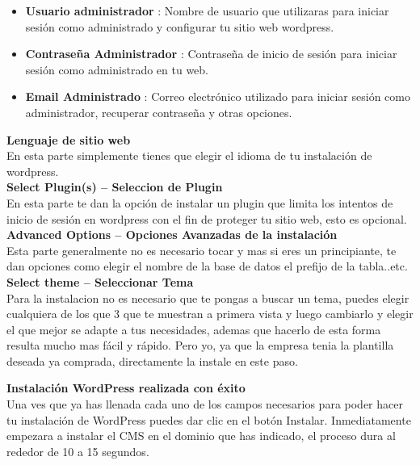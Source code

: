 		\begin{itemize}
			\item \textbf{Usuario administrador} : Nombre de usuario que utilizaras para iniciar sesión como administrado y configurar tu sitio web wordpress.
			\item \textbf{Contraseña Administrador} : Contraseña de inicio de sesión para iniciar sesión como administrado en tu web.
			\item \textbf{Email Administrado} : Correo electrónico utilizado para iniciar sesión como administrador, recuperar contraseña y otras opciones.
		\end{itemize}
		
		
		\textbf{Lenguaje de sitio web}\\
		
		En esta parte simplemente tienes que elegir el idioma de tu instalación de wordpress.\\
		
		\textbf{Select Plugin(s) – Seleccion de Plugin}\\
		
		En esta parte te dan la opción de instalar un plugin que limita los intentos de inicio de sesión en wordpress con el fin de proteger tu sitio web, esto es opcional.\\
		
		\textbf{Advanced Options  – Opciones Avanzadas de la instalación}\\
		
		Esta parte generalmente no es necesario tocar y mas si eres un principiante, te dan opciones como elegir el nombre de la base de datos el prefijo de la tabla..etc.\\
		
		\textbf{Select theme  – Seleccionar Tema}\\
		
		Para la instalacion no es necesario que te pongas a buscar un tema, puedes elegir cualquiera de los que 3 que te muestran a primera vista y luego cambiarlo y elegir el que mejor se adapte a tus necesidades, ademas que hacerlo de esta forma resulta mucho mas fácil y rápido. Pero yo, ya que la empresa tenia la plantilla deseada ya comprada, directamente la instale en este paso.\\
		
		\newpage
		
		\textbf{Instalación WordPress realizada con éxito}\\
		
		Una ves que ya has llenada cada uno de los campos necesarios para poder hacer tu instalación de WordPress  puedes dar clic en el botón Instalar. Inmediatamente empezara a instalar el CMS en el dominio que has indicado, el proceso dura al rededor de 10 a 15 segundos.\\
		
